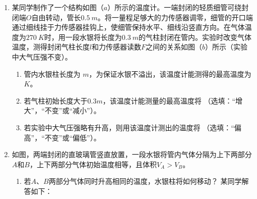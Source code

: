\begin{enumerate}[leftmargin=0em]



\item 
{}
某同学制作了一个结构如图（$ a $）所示的温度计。一端封闭的轻质细管可绕封闭端$ O $自由转动，管长$ 0.5\ m $。将一量程足够大的力传感器调零，细管的开口端通过细线挂于力传感器挂钩上，使细管保持水平、细线沿竖直方向。在气体温度为$ 270\ K $时，用一段水银将长度为$ 0.3\ m $的气柱封闭在管内。实验时改变气体温度，测得封闭气柱长度$ l $和力传感器读数$ F $之间的关系如图（$ b $）所示（实验中大气压强不变）。
\begin{enumerate}
\renewcommand{\labelenumi}{\arabic{enumi}.}
\item
管内水银柱长度为  $ m $，为保证水银不溢出，该温度计能测得的最高温度为  $ K $。
\item 
若气柱初始长度大于$ 0.3m $，该温度计能测量的最高温度将
（选填：“增大”，“不变”或“减小”）。
\item 
若实验中大气压强略有升高，则用该温度计测出的温度将  （选填：“偏高”，“不变”或“偏低”）。




\end{enumerate}
\begin{figure}[h!]
\centering

\end{figure}



\item 
{}
如图，两端封闭的直玻璃管竖直放置，一段水银将管内气体分隔为上下两部分$ A $和$ B $，上下两部分气体初始温度相等，且体积$ V_A > V_B $。
\begin{enumerate}
\renewcommand{\labelenumi}{\arabic{enumi}.}
\item
若$ A $、$ B $两部分气体同时升高相同的温度，水银柱将如何移动？
某同学解答如下：


\end{enumerate}
\end{enumerate}
